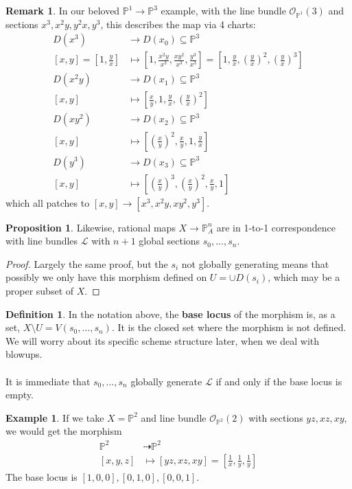 \documentclass[10pt,reqno]{amsart}
\theoremstyle{definition}
\newtheorem{example}[theorem]{Example}
\newtheorem{definition}[theorem]{Definition}
\newtheorem{proposition}[theorem]{Proposition}
\newtheorem{remark}[theorem]{Remark}
\theoremstyle{remark}
\numberwithin{equation}{section}
\numberwithin{theorem}{section}
\newcommand{\OO}{{\mathcal O}}
\newcommand{\LL}{{\mathscr L}}
\newcommand{\PP}{{\mathbb P}}
\begin{document}
\begin{remark} In our beloved $\PP^1 \to \PP^3$ example, with the line bundle $\OO_{\PP^1}(3)$ and sections $x^3,x^2y,y^2x,y^3$, this describes the map via 4 charts:
\begin{align*}
D(x^3) &\to D(x_0) \subseteq \PP^3\\
[x,y] = [1,\tfrac{y}{x}] &\mapsto \left[1,\tfrac{x^2y}{x^3}, \tfrac{xy^2}{x^3}, \tfrac{y^3}{x^3}\right] = [1, \tfrac{y}{x}, (\tfrac{y}{x})^2, (\tfrac{y}{x})^3]\\
D(x^2y) &\to D(x_1) \subseteq \PP^3\\
[x,y] &\mapsto \left[\tfrac{x}{y},1,\tfrac{y}{x}, (\tfrac{y}{x})^2\right]\\
D(xy^2) &\to D(x_2) \subseteq \PP^3\\
[x,y] &\mapsto \left[(\tfrac{x}{y})^2,\tfrac{x}{y}, 1, \tfrac{y}{x}\right]\\
D(y^3) &\to D(x_3) \subseteq \PP^3\\
[x,y] &\mapsto  \left[(\tfrac{x}{y})^3, (\tfrac{x}{y})^2,\tfrac{x}{y}, 1\right]
\end{align*}
which all patches to $[x,y] \to [x^3,x^2y,xy^2,y^3]$.
\end{remark}

\begin{proposition} Likewise, rational maps $X \to \PP^n_A$ are in 1-to-1 correspondence with line bundles $\LL$ with $n+1$ global sections $s_0,\dots,s_n$.
\end{proposition}
\begin{proof}
Largely the same proof, but the $s_i$ not globally generating means that possibly we only have this morphism defined on $U = \cup D(s_i)$, which may be a proper subset of $X$.
\end{proof}

\begin{definition} In the notation above, the \textbf{base locus} of the morphism is, as a set, $X \setminus U = V(s_0,\dots,s_n)$. It is the closed set where the morphism is not defined. We will worry about its specific scheme structure later, when we deal with blowups.
\\ \\
It is immediate that $s_0,\dots,s_n$ globally generate $\LL$ if and only if the base locus is empty.
\end{definition}

\begin{example} If we take $X = \PP^2$ and line bundle $\OO_{\PP^2}(2)$ with sections $yz,xz,xy$, we would get the morphism
\begin{align*}
\PP^2 &\dashrightarrow \PP^2\\
[x,y,z] &\mapsto [yz,xz,xy] = [\tfrac{1}{x}, \tfrac{1}{y}, \tfrac{1}{y}]
\end{align*}
The base locus is $[1,0,0], [0,1,0], [0,0,1]$.
\end{example}
\end{document}
